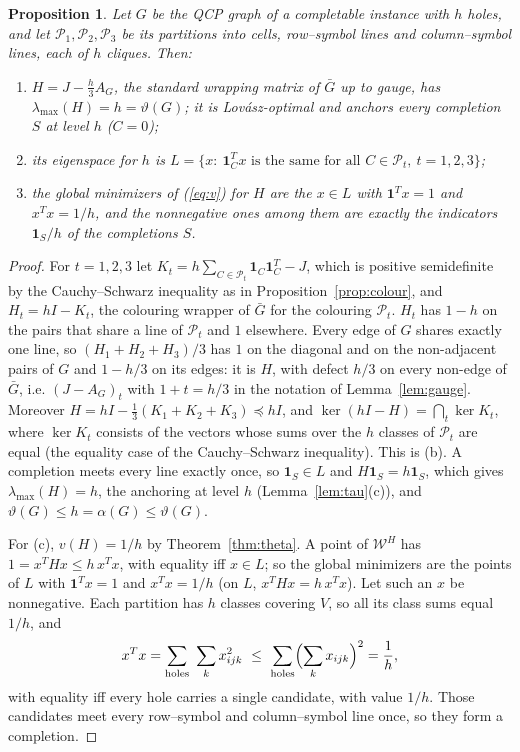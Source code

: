 \documentclass[11pt]{article}
\newtheorem{prop}[thm]{Proposition}
\theoremstyle{definition}
\theoremstyle{remark}
\newcommand{\Wc}{\mathcal{W}}
\newcommand{\one}{\mathbf{1}}
\newcommand{\lmax}{\lambda_{\max}}
\begin{document}
\begin{prop}
\label{prop:qcp}
Let $G$ be the QCP graph of a completable instance with $h$ holes, and let
$\mathcal{P}_1,\mathcal{P}_2,\mathcal{P}_3$ be its partitions into cells,
row--symbol lines and column--symbol lines, each of $h$ cliques. Then:
\begin{enumerate}
\item[(a)] $H=J-\frac h3A_G$, the standard wrapping matrix of $\bar G$ up to
gauge, has $\lmax(H)=h=\vartheta(G)$; it is Lov\'asz-optimal and anchors
every completion $S$ at level $h$ ($C=0$);
\item[(b)] its eigenspace for $h$ is
$L=\{x:\ \one_C^Tx \mbox{ is the same for all } C\in\mathcal{P}_t,\
t=1,2,3\}$;
\item[(c)] the global minimizers of (\ref{eq:v}) for $H$ are the $x\in L$
with $\one^Tx=1$ and $x^Tx=1/h$, and the nonnegative ones among them are
exactly the indicators $\one_S/h$ of the completions $S$.
\end{enumerate}
\end{prop}
\begin{proof}
For $t=1,2,3$ let $K_t=h\sum_{C\in\mathcal{P}_t}\one_C\one_C^T-J$, which is
positive semidefinite by the Cauchy--Schwarz inequality as in
Proposition~\ref{prop:colour}, and $H_t=hI-K_t$, the colouring wrapper of
$\bar G$ for the colouring $\mathcal{P}_t$. $H_t$ has $1-h$ on the pairs that
share a line of $\mathcal{P}_t$ and $1$ elsewhere. Every edge of $G$ shares
exactly one line, so $(H_1+H_2+H_3)/3$ has $1$ on the diagonal and on the
non-adjacent pairs of $G$ and $1-h/3$ on its edges: it is $H$, with defect
$h/3$ on every non-edge of $\bar G$, i.e. $(J-A_G)_t$ with $1+t=h/3$ in the
notation of Lemma~\ref{lem:gauge}. Moreover $H=hI-\frac13(K_1+K_2+K_3)
\preceq hI$, and $\ker(hI-H)=\bigcap_t\ker K_t$, where $\ker K_t$ consists
of the vectors whose sums over the $h$ classes of $\mathcal{P}_t$ are equal
(the equality case of the Cauchy--Schwarz inequality). This is (b). A
completion meets every line exactly once, so $\one_S\in L$ and
$H\one_S=h\one_S$, which gives $\lmax(H)=h$, the anchoring at level $h$
(Lemma~\ref{lem:tau}(c)), and $\vartheta(G)\leq h=\alpha(G)\leq
\vartheta(G)$.

For (c), $v(H)=1/h$ by Theorem~\ref{thm:theta}. A point of $\Wc^H$ has
$1=x^THx\leq h\,x^Tx$, with equality iff $x\in L$; so the global minimizers
are the points of $L$ with $\one^Tx=1$ and $x^Tx=1/h$ (on $L$,
$x^THx=h\,x^Tx$). Let such an $x$ be nonnegative. Each partition has $h$
classes covering $V$, so all its class sums equal $1/h$, and
\[ x^Tx=\sum_{\rm holes}\ \sum_k x_{ijk}^2\ \leq\ \sum_{\rm holes}
\Bigl(\sum_k x_{ijk}\Bigr)^2=\frac1h, \]
with equality iff every hole carries a single candidate, with value $1/h$.
Those candidates meet every row--symbol and column--symbol line once, so they
form a completion.
\end{proof}
\end{document}
